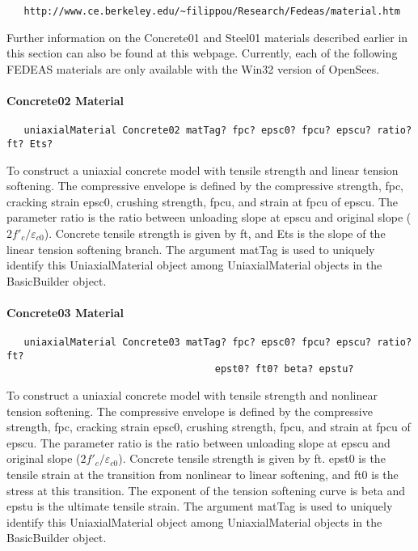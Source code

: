 \documentclass[12pt]{article}
\begin{document}
{\sf\small
\begin{verbatim}
   http://www.ce.berkeley.edu/~filippou/Research/Fedeas/material.htm
\end{verbatim}
}

\noindent Further information on the Concrete01 and Steel01 materials described earlier
in this section can also be found at this webpage. Currently, each of the following
FEDEAS materials are only available with the Win32 version of OpenSees.

\paragraph{Concrete02 Material}
{\sf\small
\begin{verbatim}
   uniaxialMaterial Concrete02 matTag? fpc? epsc0? fpcu? epscu? ratio? ft? Ets?
\end{verbatim}
}

To construct a uniaxial concrete model with tensile strength and linear tension
softening. The compressive envelope is defined by the compressive strength, fpc,
cracking strain epsc0, crushing strength, fpcu, and strain at fpcu of epscu. The
parameter ratio is the ratio between unloading slope at epscu and original slope
($2f'_c/\varepsilon_{c0}$). Concrete tensile strength is given by ft, and Ets
is the slope of the linear tension softening branch. The argument 
matTag is used to uniquely identify this UniaxialMaterial object among 
UniaxialMaterial objects in the BasicBuilder object.


\paragraph{Concrete03 Material}
{\sf\small
\begin{verbatim}
   uniaxialMaterial Concrete03 matTag? fpc? epsc0? fpcu? epscu? ratio? ft?
                                    epst0? ft0? beta? epstu?
\end{verbatim}
}

To construct a uniaxial concrete model with tensile strength and nonlinear tension
softening. The compressive envelope is defined by the compressive strength, fpc,
cracking strain epsc0, crushing strength, fpcu, and strain at fpcu of epscu. The
parameter ratio is the ratio between unloading slope at epscu and original slope
($2f'_c/\varepsilon_{c0}$). Concrete tensile strength is given by ft. epst0 is the
tensile strain at the transition from nonlinear to linear softening, and ft0 is the
stress at this transition. The exponent of the tension softening curve is beta and
epstu is the ultimate tensile strain. The argument 
matTag is used to uniquely identify this UniaxialMaterial object among 
UniaxialMaterial objects in the BasicBuilder object.
\end{document}
